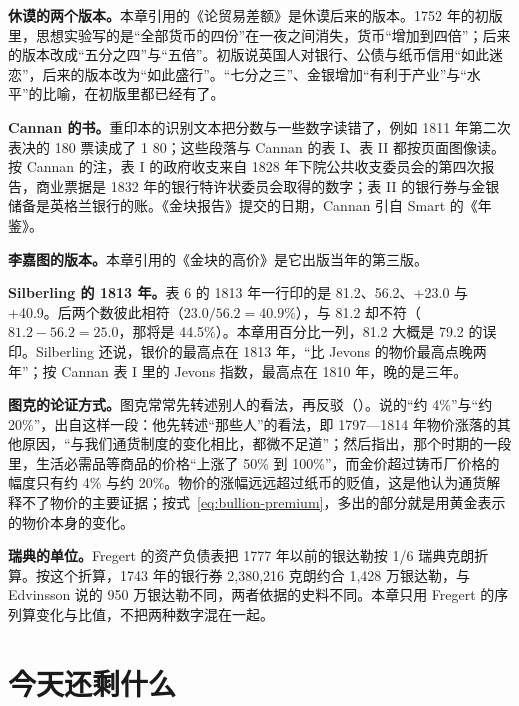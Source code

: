 \begin{deeper}[版本与史料的出入]
\textbf{休谟的两个版本。}本章引用的《论贸易差额》是休谟后来的版本。1752 年的初版里，思想实验写的是“全部货币的四份”在一夜之间消失，货币“增加到四倍”；后来的版本改成“五分之四”与“五倍”\cite{hume1752}。初版说英国人对银行、公债与纸币信用“如此迷恋”，后来的版本改为“如此盛行”。“七分之三”、金银增加“有利于产业”与“水平”的比喻，在初版里都已经有了\cite{hume1752}。

\textbf{Cannan 的书。}重印本的识别文本把分数与一些数字读错了，例如 1811 年第二次表决的 180 票读成了 1 80；这些段落与 Cannan 的表 I、表 II 都按页面图像读。按 Cannan 的注，表 I 的政府收支来自 1828 年下院公共收支委员会的第四次报告，商业票据是 1832 年的银行特许状委员会取得的数字；表 II 的银行券与金银储备是英格兰银行的账\cite{cannan1919}。《金块报告》提交的日期，Cannan 引自 Smart 的《年鉴》。

\textbf{李嘉图的版本。}本章引用的《金块的高价》是它出版当年的第三版。

\textbf{Silberling 的 1813 年。}表 6 的 1813 年一行印的是 81.2、56.2、+23.0 与 +40.9。后两个数彼此相符（$23.0/56.2=40.9\%$），与 81.2 却不符（$81.2-56.2=25.0$，那将是 44.5\%）。本章用百分比一列，81.2 大概是 79.2 的误印。Silberling 还说，银价的最高点在 1813 年，“比 Jevons 的物价最高点晚两年”\cite{silberling1919}；按 Cannan 表 I 里的 Jevons 指数，最高点在 1810 年，晚的是三年。

\textbf{图克的论证方式。}图克常常先转述别人的看法，再反驳（）。说的“约 4\%”与“约 20\%”，出自这样一段：他先转述“那些人”的看法，即 1797—1814 年物价涨落的其他原因，“与我们通货制度的变化相比，都微不足道”；然后指出，那个时期的一段里，生活必需品等商品的价格“上涨了 50\% 到 100\%”，而金价超过铸币厂价格的幅度只有约 4\% 与约 20\%\cite{tooke1838}。物价的涨幅远远超过纸币的贬值，这是他认为通货解释不了物价的主要证据；按式~\eqref{eq:bullion-premium}，多出的部分就是用黄金表示的物价本身的变化。

\textbf{瑞典的单位。}Fregert 的资产负债表把 1777 年以前的银达勒按 1/6 瑞典克朗折算。按这个折算，1743 年的银行券 2,380,216 克朗约合 1,428 万银达勒，与 Edvinsson 说的 950 万银达勒不同，两者依据的史料不同。本章只用 Fregert 的序列算变化与比值，不把两种数字混在一起。
\end{deeper}

\section{今天还剩什么}\label{sec:bullion-legacy}

